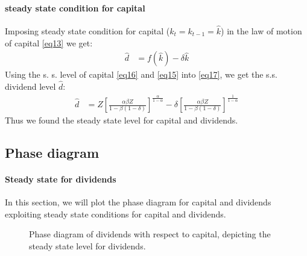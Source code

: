 \documentclass[12pt]{article}
\begin{document}
\paragraph{steady state condition for capital}
Imposing steady state condition for capital (\(k_t = k_{t-1} = \widehat{k}\)) in the law of motion of capital \ref{eq13} we
get:
\begin{align}
    \widehat{d} & = f(\widehat{k}) - \delta \widehat{k}  \label{eq17}
\end{align}
Using the s. s. level of capital \ref{eq16} and \ref{eq15} into \ref{eq17}, we get the s.s. dividend level \(\widehat{d}\):
\begin{align}
    \widehat{d} &=Z\left[\frac{\alpha \beta Z}{1-\beta(1-\delta)}\right]^{\frac{\alpha}{1-\alpha}}-\delta\left[\frac{\alpha \beta Z}{1-\beta(1-\delta)}\right]^{\frac{1}{1-\alpha}}
     \label{eq18}
\end{align}
Thus we found the steady state level for capital and dividends.
\subsection{Phase diagram}
\paragraph{Steady state for dividends}
In this section, we will plot the phase diagram for capital and dividends exploiting steady state conditions for capital and
dividends. 
\begin{figure}
    \centering
    \caption{Phase diagram of dividends with respect to capital, depicting the steady state level for dividends.}
    \label{fig:dividend_dynamics}
\end{figure}
\end{document}
